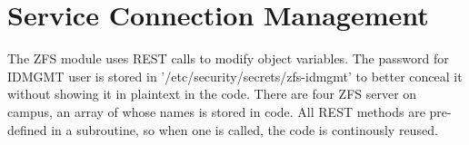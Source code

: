 \section{Service Connection Management}

The ZFS module uses REST calls to modify object variables. The password for IDMGMT user is stored in '/etc/security/secrets/zfs-idmgmt' to better conceal it without showing it in plaintext in the code. There are four ZFS server on campus, an array of whose names is stored in code. All REST methods are pre-defined in a subroutine, so when one is called, the code is continously reused. 
